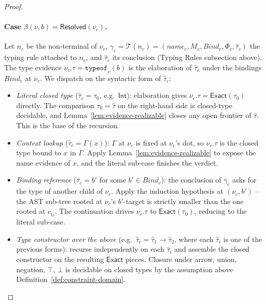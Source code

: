 \begin{proof}
	\paragraph{Case $\beta(\nu,b) = \mathsf{Resolved}(\nu_c)$.} Let $n_c$ be the non-terminal of $\nu_c$, $\gamma_c = \mathcal T(n_c) = (\mathit{name}_c, M_c, \mathit{Bind}_c, \Phi_c, \hat\tau_c)$ the typing rule attached to $n_c$, and $\hat\tau_c$ its conclusion (Typing Rules subsection above). The type evidence $\nu_c.\tau = \mathtt{typeof}_\nu(b)$ is the elaboration of $\hat\tau_c$ under the bindings $\mathit{Bind}_c$ at $\nu_c$. We dispatch on the syntactic form of $\hat\tau_c$:
	\begin{itemize}
		\item \emph{Literal closed type} ($\hat\tau_c = \tau_0$, e.g.\ $\mathsf{Int}$): elaboration gives $\nu_c.\tau = \mathsf{Exact}(\tau_0)$ directly. The comparison $\tau_0 = \hat\tau$ on the right-hand side is closed-type decidable, and Lemma~\ref{lem:evidence-realizable} closes any open frontier of $\hat\tau$. This is the base of the recursion.
		\item \emph{Context lookup} ($\hat\tau_c = \Gamma(x)$): $\Gamma$ at $\nu_c$ is fixed at $\nu_c$'s dot, so $\nu_c.\tau$ is the closed type bound to $x$ in $\Gamma$. Apply Lemma~\ref{lem:evidence-realizable} to expose the name evidence of $x$, and the literal sub-case finishes the verdict.
		\item \emph{Binding reference} ($\hat\tau_c = b'$ for some $b' \in \mathit{Bind}_c$): the conclusion of $\gamma_c$ asks for the type of another child of $\nu_c$. Apply the induction hypothesis at $(\nu_c, b')$ -- the AST sub-tree rooted at $\nu_c$'s $b'$-target is strictly smaller than the one rooted at $c_{i_b}$. The continuation drives $\nu_c.\tau$ to $\mathsf{Exact}(\tau_0)$, reducing to the literal sub-case.
		\item \emph{Type constructor over the above} (e.g.\ $\hat\tau_c = \hat\tau_1 \to \hat\tau_2$, where each $\hat\tau_i$ is one of the previous forms): recurse independently on each $\hat\tau_i$ and assemble the closed constructor on the resulting $\mathsf{Exact}$ pieces. Closure under arrow, union, negation, $\top$, $\bot$ is decidable on closed types by the assumption above Definition~\ref{def:constraint-domain}.
	\end{itemize}
\end{proof}

